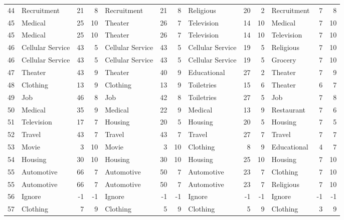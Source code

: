 \begin{figure}[htbp]
\begin{tabular}{rlrrlrrlrrlrr}
    44    & Recruitment & 21    & 8     & Recruitment & 21    & 8     & Religious & 20    & 2     & Recruitment & 7     & 8 \\
    45    & Medical & 25    & 10    & Theater & 26    & 7     & Television & 14    & 10    & Medical & 7     & 10 \\
    45    & Medical & 25    & 10    & Theater & 26    & 7     & Television & 14    & 10    & Television & 7     & 10 \\
    46    & Cellular Service & 43    & 5     & Cellular Service & 43    & 5     & Cellular Service & 19    & 5     & Religious & 7     & 10 \\
    46    & Cellular Service & 43    & 5     & Cellular Service & 43    & 5     & Cellular Service & 19    & 5     & Grocery & 7     & 10 \\
    47    & Theater & 43    & 9     & Theater & 40    & 9     & Educational & 27    & 2     & Theater & 7     & 9 \\
    48    & Clothing & 13    & 9     & Clothing & 13    & 9     & Toiletries & 15    & 6     & Theater & 6     & 7 \\
    49    & Job   & 46    & 8     & Job   & 42    & 8     & Toiletries & 27    & 5     & Job   & 7     & 8 \\
    50    & Medical & 35    & 9     & Medical & 22    & 9     & Medical & 13    & 9     & Restaurant & 7     & 6 \\
    51    & Television & 17    & 7     & Housing & 20    & 5     & Housing & 20    & 5     & Housing & 7     & 5 \\
    52    & Travel & 43    & 7     & Travel & 43    & 7     & Travel & 27    & 7     & Travel & 7     & 7 \\
    53    & Movie & 3     & 10    & Movie & 3     & 10    & Clothing & 8     & 9     & Educational & 4     & 7 \\
    54    & Housing & 30    & 10    & Housing & 30    & 10    & Housing & 25    & 10    & Housing & 7     & 10 \\
    55    & Automotive & 66    & 7     & Automotive & 50    & 7     & Automotive & 23    & 7     & Clothing & 7     & 10 \\
    55    & Automotive & 66    & 7     & Automotive & 50    & 7     & Automotive & 23    & 7     & Religious & 7     & 10 \\
    56    & Ignore & -1    & -1    & Ignore & -1    & -1    & Ignore & -1    & -1    & Ignore & -1    & -1 \\
    57    & Clothing & 7     & 9     & Clothing & 5     & 9     & Clothing & 5     & 9     & Clothing & 3     & 9 \\

\end{tabular}
\end{figure}
